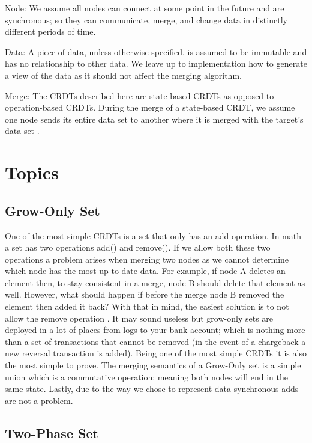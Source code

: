 \documentclass{article}
\begin{document}
\begin{multicols}{2}
\begin{refsection}
Node: We assume all nodes can connect at some point in the future and are synchronous; so they can communicate, merge, and change data in distinctly different periods of time.

Data: A piece of data, unless otherwise specified, is assumed to be immutable and has no relationship to other data. We leave up to implementation how to generate a view of the data as it should not affect the merging algorithm.

Merge: The CRDTs described here are state-based CRDTs as opposed to operation-based CRDTs. During the merge of a state-based CRDT, we assume one node sends its entire data set to another where it is merged with the target's data set \cite{shapiro_comprehensive_2011}.

\section*{Topics}

\subsection*{Grow-Only Set}

One of the most simple CRDTs is a set that only has an add operation. In math a set has two operations add() and remove(). If we allow both these two operations a problem arises when merging two nodes as we cannot determine which node has the most up-to-date data. For example, if node A deletes an element then, to stay consistent in a merge, node B should delete that element as well. However, what should happen if before the merge node B removed the element then added it back? With that in mind, the easiest solution is to not allow the remove operation \cite{shapiro_comprehensive_2011}. It may sound useless but grow-only sets are deployed in a lot of places from logs to your bank account; which is nothing more than a set of transactions that cannot be removed (in the event of a chargeback a new reversal transaction is added). Being one of the most simple CRDTs it is also the most simple to prove. The merging semantics of a Grow-Only set is a simple union which is a commutative operation; meaning both nodes will end in the same state. Lastly, due to the way we chose to represent data synchronous adds are not a problem.

\subsection*{Two-Phase Set}


\end{refsection}
\end{multicols}
\end{document}
